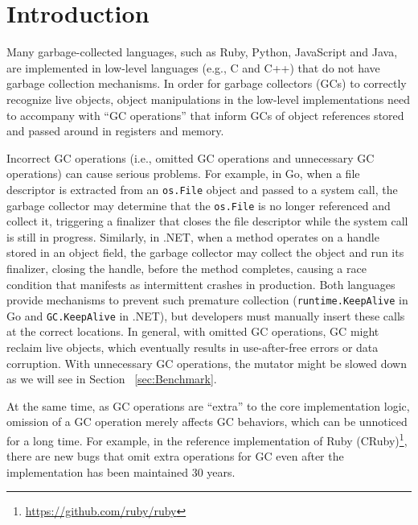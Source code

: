 \section{Introduction}
Many garbage-collected languages, such as Ruby, Python, JavaScript and Java, are implemented in low-level languages (e.g., C and C++) that do not have garbage collection mechanisms.  In order for garbage collectors (GCs) to correctly recognize live objects, object manipulations in the low-level implementations need to accompany with ``GC operations'' that inform GCs of object references stored and passed around in registers and memory.

Incorrect GC operations (i.e., omitted GC operations and unnecessary GC operations) can cause serious problems.
For example, in Go, when a file descriptor is extracted from an \texttt{os.File} object and passed to a system call, the garbage collector may determine that the \texttt{os.File} is no longer referenced and collect it, triggering a finalizer that closes the file descriptor while the system call is still in progress\cite{GoKeepAlive,GoIssue9046}.
Similarly, in .NET, when a method operates on a handle stored in an object field, the garbage collector may collect the object and run its finalizer, closing the handle, before the method completes, causing a race condition that manifests as intermittent crashes in production\cite{DotNetKeepAlive,DotNetIssue103522,DotNetBlog}.
Both languages provide mechanisms to prevent such premature collection (\texttt{runtime.KeepAlive} in Go and \texttt{GC.KeepAlive} in .NET), but developers must manually insert these calls at the correct locations.
In general, with omitted GC operations, GC might reclaim live objects, which eventually results in use-after-free errors or data corruption.  With unnecessary GC operations, the mutator might be slowed down as we will see in Section ~\ref{sec:Benchmark}.

At the same time, as GC operations are ``extra'' to the core implementation logic, omission of a GC operation merely affects GC behaviors, which can be unnoticed for a long time.  For example, in the reference implementation of Ruby (CRuby)\footnote{\url{https://github.com/ruby/ruby}}, there are new bugs that omit extra operations for GC even after the implementation has been maintained 30 years\cite{newly_found_missing}.

